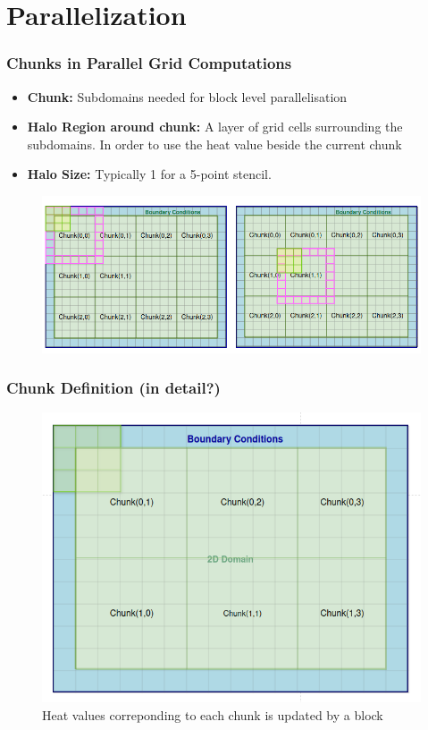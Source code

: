 \documentclass[9pt]{beamer}
\begin{document}
\section{Parallelization}

\begin{frame}
\frametitle{Chunks in Parallel Grid Computations}
\begin{itemize}
 
    \item \textbf{Chunk:} Subdomains needed for block level parallelisation
    \item \textbf{Halo Region around chunk:} A layer of grid cells surrounding the subdomains. In order to use the heat value beside the current chunk
    \item \textbf{Halo Size:} Typically 1 for a 5-point stencil.
\end{itemize}

\begin{figure}
    \centering
    \includegraphics[width=0.8\linewidth]{Screenshot from 2024-08-30 19-03-50.png}
    \label{fig:enter-label}
\end{figure}
\end{frame}

\begin{frame}
\frametitle{Chunk Definition (in detail?)}
\begin{figure}
    \centering
    \includegraphics[width=0.85\linewidth]{Screenshot from 2024-09-02 14-11-22.png}
    \caption{Heat values correponding to each chunk is updated by a block}
    \label{fig:enter-label}
\end{figure}
\end{frame}
\end{document}
